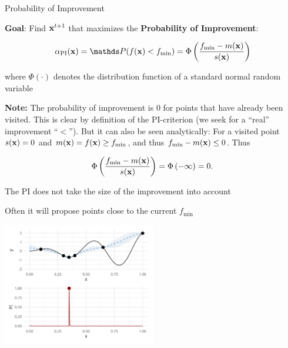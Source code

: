 \documentclass[11pt,compress,t,notes=noshow, xcolor=table]{beamer}
\begin{document}
\begin{vbframe}{Probability of Improvement}

\textbf{Goal}: Find $\mathbf{x}^{t+1}$ that maximizes the \textbf{Probability of Improvement}:

$$
  \alpha_{\text{PI}}(\xv) = \P(f(\xv) < f_{\min}) = \Phi\left(\frac{f_{\min} - m(\xv)}{ s(\xv)}\right)
$$

where $\Phi(\cdot)$ denotes the distribution function of a standard normal random variable

\vfill

\begin{footnotesize}
\textbf{Note:} The probability of improvement is $0$ for points that have already been visited. This is clear by definition of the PI-criterion (we seek for a \enquote{real} improvement \enquote{$<$}). But it can also be seen analytically: For a visited point $s(\mathbf{x}) = 0$ and $m(\mathbf{x}) = f(\mathbf{x}) \ge f_{\min}$, and thus $f_{\min} - m(\mathbf{x}) \le 0$. Thus

$$
  \Phi\left(\frac{f_{\min} - m(\mathbf{x})}{s(\mathbf{x})}\right) = \Phi\left(- \infty\right) = 0.
$$

\end{footnotesize}

\framebreak

The PI does not take the size of the improvement into account

Often it will propose points close to the current $f_{\min}$

\begin{center}
  \includegraphics[width = 0.5\textwidth]{figure_man/bayesian_loop_pi_0.png}
\end{center}

\end{vbframe}
\end{document}
